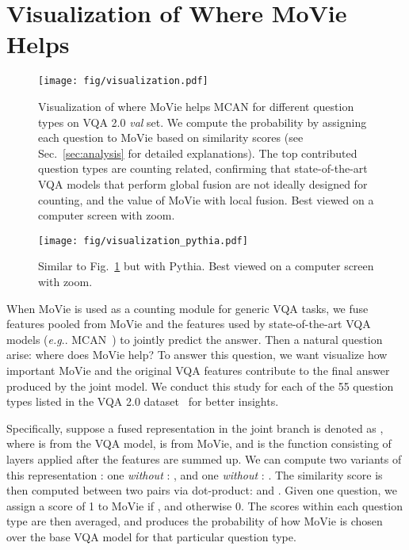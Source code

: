 \documentclass{article} \usepackage[dvipsnames,table]{xcolor}
\makeatletter
\newcommand{\ours}[0]{MoVie\xspace}
\DeclareRobustCommand\onedot{\futurelet\@let@token\@onedot}
\def\@onedot{\ifx\@let@token.\else.\null\fi\xspace}
\def\eg{\emph{e.g}\onedot} \def\Eg{\emph{E.g}\onedot}
\makeatother
\begin{document}
\section{Visualization of Where \ours Helps\label{sec:analysis}}

\begin{figure}[t]
\centering
\texttt{[image: fig/visualization.pdf]}
\caption{Visualization of where \ours helps MCAN for different question types on VQA 2.0 \emph{val} set. We compute the probability by assigning each question to \ours based on similarity scores (see Sec.~\ref{sec:analysis} for detailed explanations). The top contributed question types are counting related, confirming that state-of-the-art VQA models that perform global fusion are not ideally designed for counting, and the value of \ours with local fusion. Best viewed on a computer screen with zoom.}
\label{fig:two_branch}
\end{figure}

\begin{figure}[!ht]
\centering
\texttt{[image: fig/visualization\_pythia.pdf]}
\caption{Similar to Fig.~\ref{fig:two_branch} but with Pythia. Best viewed on a computer screen with zoom.}
\label{fig:two_branch_pythia}
\end{figure}


When \ours is used as a counting module for generic VQA tasks, we fuse features pooled from \ours and the features used by state-of-the-art VQA models (\eg MCAN~\cite{yu2019deep}) to jointly predict the answer. Then a natural question arise: where does \ours help? To answer this question, we want visualize how important \ours and the original VQA features contribute to the final answer produced by the joint model. We conduct this study for each of the 55 question types listed in the VQA 2.0 dataset~\cite{antol2015vqa} for better insights. 

Specifically, suppose a fused representation in the joint branch is denoted as , where  is from the VQA model,  is from \ours, and  is the function consisting of layers applied after the features are summed up. We can compute two variants of this representation : one \emph{without} : , and one \emph{without} : . The similarity score is then computed between two pairs via dot-product:  and . Given one question, we assign a score of 1 to \ours if , and otherwise 0. The scores within each question type are then averaged, and produces the probability of how \ours is chosen over the base VQA model for that particular question type.
\end{document}
